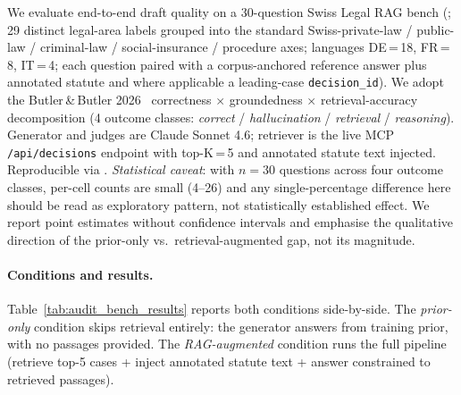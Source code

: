 \documentclass[11pt,a4paper]{article}
\begin{document}
We evaluate end-to-end draft quality on a 30-question Swiss Legal RAG bench (; 29 distinct legal-area labels grouped into the standard Swiss-private-law / public-law / criminal-law / social-insurance / procedure axes; languages DE\,{=}\,18, FR\,{=}\,8, IT\,{=}\,4; each question paired with a corpus-anchored reference answer plus annotated statute and where applicable a leading-case \texttt{decision\_id}). We adopt the Butler\,\&\,Butler 2026~\cite{butler2026} correctness $\times$ groundedness $\times$ retrieval-accuracy decomposition (4 outcome classes: \emph{correct} / \emph{hallucination} / \emph{retrieval} / \emph{reasoning}). Generator and judges are Claude Sonnet 4.6; retriever is the live MCP \texttt{/api/decisions} endpoint with top-K\,{=}\,5 and annotated statute text injected. Reproducible via . \emph{Statistical caveat}: with $n=30$ questions across four outcome classes, per-cell counts are small (4--26) and any single-percentage difference here should be read as exploratory pattern, not statistically established effect. We report point estimates without confidence intervals and emphasise the qualitative direction of the prior-only vs.\ retrieval-augmented gap, not its magnitude.



\paragraph{Conditions and results.} Table~\ref{tab:audit_bench_results} reports both conditions side-by-side. The \emph{prior-only} condition skips retrieval entirely: the generator answers from training prior, with no passages provided. The \emph{RAG-augmented} condition runs the full pipeline (retrieve top-5 cases + inject annotated statute text + answer constrained to retrieved passages).
\end{document}
